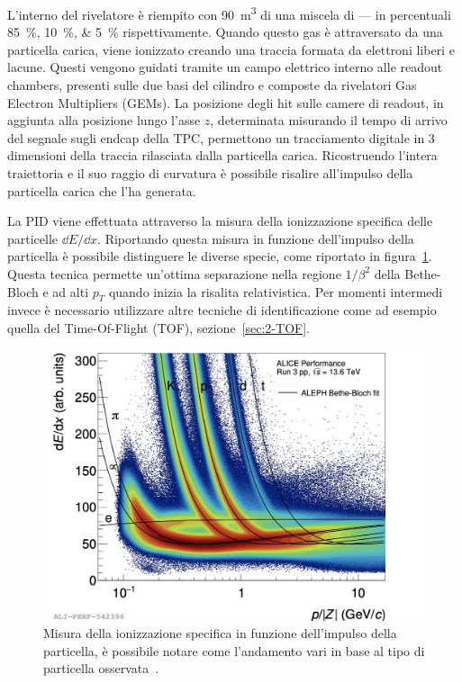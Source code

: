     L’interno del rivelatore è riempito con \qty{90}{\meter^3} di una miscela di ---- in percentuali \qtylist{85;10;5}{\percent} rispettivamente. Quando questo gas è attraversato da una particella carica, viene ionizzato creando una traccia formata da elettroni liberi e lacune. Questi vengono guidati tramite un campo elettrico interno alle readout chambers, presenti sulle due basi del cilindro e composte da rivelatori Gas Electron Multipliers (GEMs). La posizione degli hit sulle camere di readout, in aggiunta alla posizione lungo l’asse $z$, determinata misurando il tempo di arrivo del segnale sugli endcap della TPC, permettono un tracciamento digitale in 3 dimensioni della traccia rilasciata dalla particella carica. Ricostruendo l’intera traiettoria e il suo raggio di curvatura è possibile risalire all’impulso della particella carica che l’ha generata.
    
    La PID viene effettuata attraverso la misura della ionizzazione specifica delle particelle $\dd{E}/\dd{x}$. Riportando questa misura in funzione dell’impulso della particella è possibile distinguere le diverse specie, come riportato in figura~\ref{fig:2-6-ALICE-pp13.6TeV-performance}. Questa tecnica permette un'ottima separazione nella regione $1/\beta^2$ della Bethe-Bloch e ad alti $p_{T}$ quando inizia la risalita relativistica. Per momenti intermedi invece è necessario utilizzare altre tecniche di identificazione come ad esempio quella del Time-Of-Flight (TOF), sezione~\ref{sec:2-TOF}.


    \begin{figure}[p]
        \centering
        \includegraphics[width=1\linewidth]{res/fig/2-chapter/6-ALICE-pp13.6TeV-performance.jpg}
        \caption{Misura della ionizzazione specifica in funzione dell’impulso della particella, è possibile notare come l’andamento vari in base al tipo di particella osservata~\cite{}.}
        \label{fig:2-6-ALICE-pp13.6TeV-performance}
    \end{figure}

